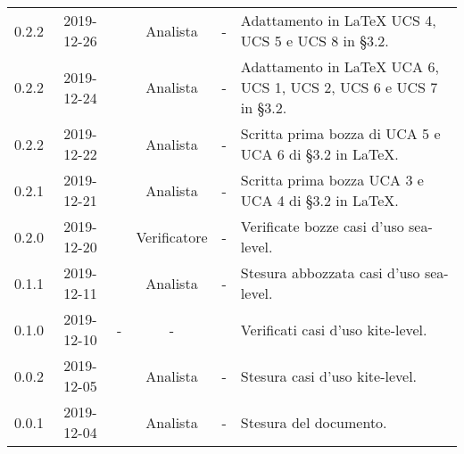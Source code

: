 {\begin{longtable}{ c c  C{2.3cm} c C{3cm} C{3.2cm}}
0.2.2 & 2019-12-26 & \CE{} & Analista & - & Adattamento in \LaTeX{} UCS 4, UCS 5 e UCS 8 in §3.2. \\

0.2.2 & 2019-12-24 & \DF{} & Analista & - & Adattamento in \LaTeX{} UCA 6, UCS 1, UCS 2, UCS 6 e UCS 7 in §3.2. \\

0.2.2 & 2019-12-22 & \PF{} & Analista & - & Scritta prima bozza di UCA 5 e UCA 6 di §3.2 in \LaTeX. \\

0.2.1 & 2019-12-21 & \PF{} & Analista & - & Scritta prima bozza UCA 3 e UCA 4 di §3.2 in \LaTeX. \\

0.2.0 & 2019-12-20 & \SE{} & Verificatore & - & Verificate bozze casi d'uso sea-level. \\

0.1.1 & 2019-12-11 & \DF{} & Analista & - & Stesura abbozzata casi d'uso sea-level. \\

0.1.0 & 2019-12-10 & - & - & \BR{} & Verificati casi d'uso kite-level. \\

0.0.2 & 2019-12-05 & \CE{} & Analista & - & Stesura casi d'uso kite-level. \\

0.0.1 & 2019-12-04 & \CE{} & Analista & - & Stesura del documento. \\		
		
\end{longtable}
}